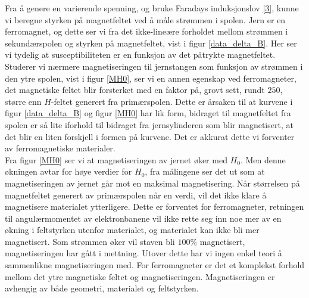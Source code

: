 \documentclass[%
 reprint,
nofootinbib,
aps,
]{revtex4-1}
\begin{document}
Fra å genere en varierende spenning, og bruke Faradays induksjonslov \eqref{3}, kunne vi beregne styrken på magnetfeltet ved å måle strømmen i spolen. Jern er en ferromagnet, og dette ser vi fra det ikke-lineære forholdet mellom strømmen i sekundærspolen og styrken på magnetfeltet, vist i figur \vref{data_delta_B}. Her ser vi tydelig at susceptibiliteten er en funksjon av det påtrykte magnetfeltet. Studerer vi nærmere magnetiseringen til jernstangen som funksjon av strømmen i den ytre spolen, vist i figur \vref{MH0}, ser vi en annen egenskap ved ferromagneter, det magnetiske feltet blir forsterket med en faktor på, grovt sett, rundt $250$, større enn $H$-feltet generert fra primærspolen. Dette er årsaken til at kurvene i figur \vref{data_delta_B} og figur \vref{MH0} har lik form, bidraget til magnetfeltet fra spolen er så lite iforhold til bidraget fra jernsylinderen som blir magnetisert, at det blir en liten forskjell i formen på kurvene. Det er akkurat dette vi forventer av ferromagnetiske materialer.\\
Fra figur \vref{MH0} ser vi at magnetiseringen av jernet øker med $H_0$. Men denne økningen avtar for høye verdier for $H_0$, fra målingene ser det ut som at magnetiseringen av jernet går mot en maksimal magnetisering. Når størrelsen på magnetfeltet generert av primærspolen når en verdi, vil det ikke klare å magnetisere materialet ytterligere. Dette er forventet for ferromagneter, retningen til angulærmomentet av elektronbanene vil ikke rette seg inn noe mer av en økning i feltstyrken utenfor materialet, og materialet kan ikke bli mer magnetisert. Som strømmen øker vil staven bli $100\%$ magnetisert, magnetiseringen har gått i mettning. Utover dette har vi ingen enkel teori å sammenlikne magnetiseringen med. For ferromagneter er det et komplekst forhold mellom det ytre magnetiske feltet og magnetiseringen. Magnetiseringen er avhengig av både geometri, materialet og feltstyrken.
\end{document}
